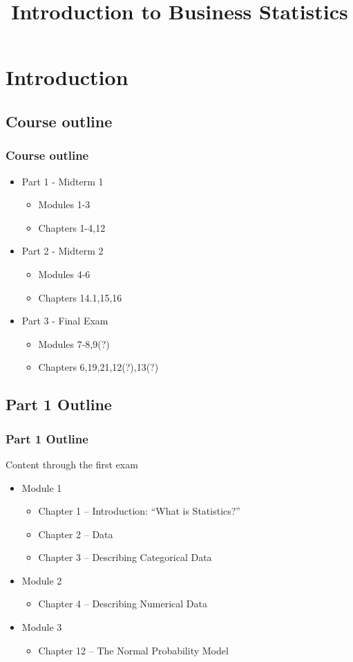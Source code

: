 \documentclass[handout]{beamer}
\title{Introduction to Business Statistics}
\begin{document}
\begin{frame}
\titlepage
\end{frame}


\section{Introduction}
\subsection{Course outline}
\begin{frame}
\frametitle{Course outline}

\begin{itemize}
\item Part 1 - Midterm 1
  \begin{itemize}
  \item Modules 1-3
  \item Chapters 1-4,12
  \end{itemize}
\item Part 2 - Midterm 2
  \begin{itemize}
  \item Modules 4-6
  \item Chapters 14.1,15,16
  \end{itemize}
\item Part 3 - Final Exam
  \begin{itemize}
  \item Modules 7-8,9(?)
  \item Chapters 6,19,21,12(?),13(?)
  \end{itemize}
\end{itemize}

\end{frame}


\subsection{Part 1 Outline}
\begin{frame}
\frametitle{Part 1 Outline}

Content through the first exam

\begin{itemize}
\item Module 1
  \begin{itemize}
  \item Chapter 1 -- Introduction: ``What is Statistics?''
  \item Chapter 2 -- Data
  \item Chapter 3 -- Describing Categorical Data
  \end{itemize}
\item Module 2
  \begin{itemize}
  \item Chapter 4 -- Describing Numerical Data
  \end{itemize}
\item Module 3
  \begin{itemize}
  \item Chapter 12 --  The Normal Probability Model
  \end{itemize}
\end{itemize}
\end{frame}
\end{document}
